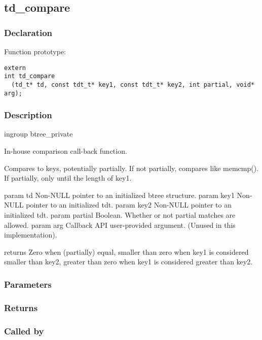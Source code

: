
\newpage
\subsection{td\_compare}
\subsubsection{Declaration} Function prototype:

\begin{verbatim}
extern
int td_compare
  (td_t* td, const tdt_t* key1, const tdt_t* key2, int partial, void* arg);
\end{verbatim}

\subsubsection{Description}


 ingroup btree\_private

 In-house comparison call-back function.

 Compares to keys, potentially partially.
 If not partially, compares like memcmp().
 If partially, only until the length of key1.

 param td Non-NULL pointer to an initialized btree structure. 
 param key1 Non-NULL pointer to an initialized tdt.
 param key2 Non-NULL pointer to an initialized tdt.
 param partial Boolean. Whether or not partial matches are allowed.
 param arg Callback API user-provided argument.
 (Unused in this implementation).

 returns Zero when (partially) equal, smaller than zero when key1 is
 considered smaller than key2, greater than zero when key1 is considered
 greater than key2.
 

\subsubsection{Parameters}
\subsubsection{Returns}
\subsubsection{Called by}
